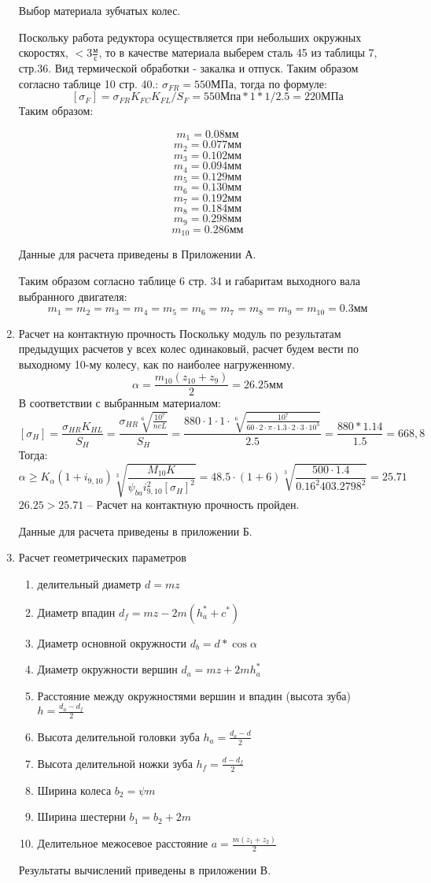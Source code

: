 \documentclass{article}
\begin{document}
\begin{enumerate}
	Выбор материала зубчатых колес.

	Поскольку работа редуктора осуществляется при небольших окружных скоростях, $ < 3 \frac{м}{с} $, то в качестве материала выберем сталь 45 из таблицы 7, стр.36. Вид термической обработки - закалка и отпуск.
	Таким образом согласно таблице 10 стр. 40.: $ \sigma_{FR} = 550 МПа$, тогда по формуле:
	$$
	[ \sigma_F] = \sigma_{FR} K_{FC} K_{FL} / S_F = 550 Мпа * 1 * 1 / 2.5 = 220 МПа
	$$
	Таким образом:

	$$
	m_1 = 0.08 мм
	$$
	$$
	m_2 = 0.077 мм
	$$
	$$
	m_3 = 0.102 мм
	$$
	$$
	m_4 = 0.094 мм
	$$
	$$
	m_5 = 0.129 мм
	$$
	$$
	m_6 = 0.130 мм
	$$
	$$
	m_7 = 0.192 мм
	$$
	$$
	m_8 = 0.184 мм
	$$
	$$
	m_9 = 0.298 мм
	$$
	$$
	m_{10} = 0.286 мм
	$$

	Данные для расчета приведены в Приложении А.

	Таким образом согласно таблице 6 стр. 34 и габаритам выходного вала выбранного двигателя:
	$$
	m_1 = m_2 = m_3 = m_4 = m_5 = m_6 = m_7 = m_8 = m_9 = m_{10} = 0.3 мм
	$$
	\item Расчет на контактную прочность
	Поскольку модуль по результатам предыдущих расчетов у всех колес одинаковый, расчет будем вести по выходному 10-му колесу, как по наиболее нагруженному.
	$$
	\alpha = \frac{m_{10} (z_{10} + z_9)}{2} = 26.25 мм 
	$$
	В соответствии с выбранным материалом:
	$$
	[ \sigma_H] = \frac{\sigma_{HR} K_{HL} }{S_{H}} = \frac{ \sigma_{HR} \sqrt[6]{ \frac{10^7}{n c L} }}{S_{H}} = \frac{880 \cdot 1 \cdot 1 \cdot \sqrt[6]{ \frac{10^7}{60 \cdot 2 \cdot \pi \cdot 1.3 \cdot 2 \cdot 3 \cdot 10^3} }}{2.5} = \frac{880 * 1.14}{1.5} = 668,8
	$$
	Тогда:
	$$
	\alpha \ge K_{ \alpha} (1 + i_{9,10})\sqrt[3]{\frac{M_{10} K}{\psi_{ba} i_{9,10}^2 [ \sigma_H]^2}} = 48.5 \cdot (1 + 6) \sqrt[3]{\frac{500 \cdot 1.4}{0.1 6^2 403.2798^2}} = 25.71
	$$
	$26.25 > 25.71$ -- Расчет на контактную прочность пройден.

	Данные для расчета приведены в приложении Б.

	\item Расчет геометрических параметров
	\begin{enumerate}
		\item делительный диаметр $d = m z$
		\item Диаметр впадин $d_f = m z - 2 m (h_a^* + c^*)$
		\item Диаметр основной окружности $d_b = d * \cos{ \alpha}$
		\item Диаметр окружности вершин $d_a = m z + 2 m h_a^*$
		\item Расстояние между окружностями вершин и впадин (высота зуба) $h = \frac{d_a - d_f}{2}$
		\item Высота делительной головки зуба $h_a = \frac{d_a - d}{2} $
		\item Высота делительной ножки зуба $h_f = \frac {d - d_f}{2}$
		\item Ширина колеса $b_2 = \psi m$
		\item Ширина шестерни $b_1 = b_2 + 2 m$
		\item Делительное межосевое расстояние $a = \frac{m (z_1 + z_2)}{2} $
	\end{enumerate}
	Результаты вычислений приведены в приложении В.


\end{enumerate}
\end{document}
